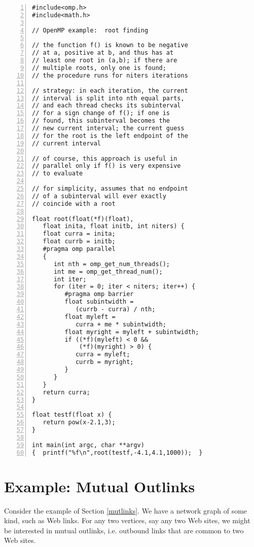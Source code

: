 \begin{lstlisting}[numbers=left]
#include<omp.h>
#include<math.h>

// OpenMP example:  root finding

// the function f() is known to be negative
// at a, positive at b, and thus has at
// least one root in (a,b); if there are
// multiple roots, only one is found;
// the procedure runs for niters iterations

// strategy: in each iteration, the current
// interval is split into nth equal parts,
// and each thread checks its subinterval
// for a sign change of f(); if one is
// found, this subinterval becomes the
// new current interval; the current guess
// for the root is the left endpoint of the
// current interval

// of course, this approach is useful in
// parallel only if f() is very expensive
// to evaluate

// for simplicity, assumes that no endpoint
// of a subinterval will ever exactly
// coincide with a root

float root(float(*f)(float),
   float inita, float initb, int niters) {
   float curra = inita;
   float currb = initb;
   #pragma omp parallel
   {
      int nth = omp_get_num_threads();
      int me = omp_get_thread_num();
      int iter;
      for (iter = 0; iter < niters; iter++) {
         #pragma omp barrier
         float subintwidth =
            (currb - curra) / nth;
         float myleft =
            curra + me * subintwidth;
         float myright = myleft + subintwidth;
         if ((*f)(myleft) < 0 &&
             (*f)(myright) > 0) {
            curra = myleft;
            currb = myright;
         }
      }
   }
   return curra;
}

float testf(float x) {
   return pow(x-2.1,3);
}

int main(int argc, char **argv)
{  printf("%f\n",root(testf,-4.1,4.1,1000));  }
\end{lstlisting}

\section{Example:  Mutual Outlinks}
\label{ompmutlinks}

Consider the example of Section \ref{mutlinks}.  We have
a network graph of some kind, such as Web links.  For any two
vertices, say any two Web sites, we might be interested in mutual
outlinks, i.e. outbound links that are common to two Web sites.

